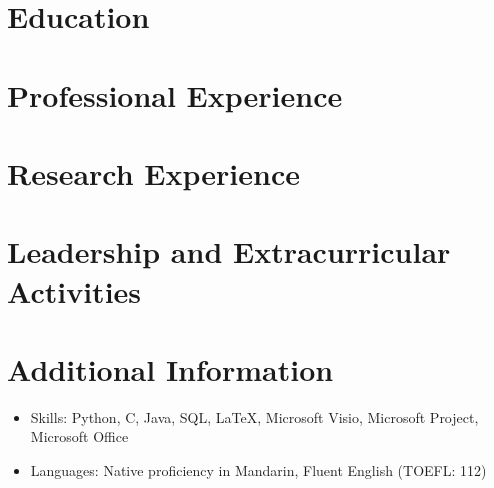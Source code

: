 \documentclass{resumeEN}
\begin{document}
\section{Education}

\thuundergrad
\umnexchange

\section{Professional Experience}

\continental
\summitview

\section{Research Experience}

\umnresearch
\fifaresearch

\section{Leadership and Extracurricular Activities}

\eydatascience
\cydp
\tkd
\semtech

\section{Additional Information}

\vspace{0.618ex}
\begin{itemize}
\item Skills:  Python, C, Java, SQL, {\LaTeX}, Microsoft Visio, Microsoft Project, Microsoft Office
\item Languages: Native proficiency in Mandarin, Fluent English (TOEFL: 112)
\end{itemize}
\end{document}
